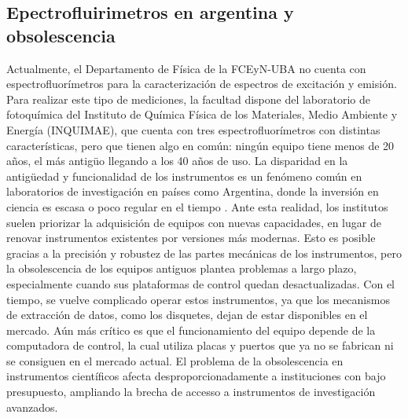 \subsection{Epectrofluirimetros en argentina y obsolescencia}

Actualmente, el Departamento de Física de la FCEyN-UBA no cuenta con espectrofluorímetros para la caracterización de espectros de excitación y emisión.  
Para realizar este tipo de mediciones, la facultad dispone del laboratorio de fotoquímica del Instituto de Química Física de los Materiales, Medio Ambiente y Energía (INQUIMAE), que cuenta con tres espectrofluorímetros con distintas características, pero que tienen algo en común: ningún equipo tiene menos de 20 años, el más antigüo llegando a los 40 años de uso.
La disparidad en la antigüedad y funcionalidad de los instrumentos es un fenómeno común en laboratorios de investigación en países como Argentina, donde la inversión en ciencia es escasa o poco regular en el tiempo \cite{cioccaRealityScientificResearch2017}. 
Ante esta realidad, los institutos suelen priorizar la adquisición de equipos con nuevas capacidades, en lugar de renovar instrumentos existentes por versiones más modernas.  
Esto es posible gracias a la precisión y robustez de las partes mecánicas de los instrumentos, pero la obsolescencia de los equipos antiguos plantea problemas a largo plazo, especialmente cuando sus plataformas de control quedan desactualizadas.  
Con el tiempo, se vuelve complicado operar estos instrumentos, ya que los mecanismos de extracción de datos, como los disquetes, dejan de estar disponibles en el mercado. 
Aún más crítico es que el funcionamiento del equipo depende de la computadora de control, la cual utiliza placas y puertos que ya no se fabrican ni se consiguen en el mercado actual.  
El problema de la obsolescencia en instrumentos científicos afecta desproporcionadamente a instituciones con bajo presupuesto, ampliando la brecha de accesso a instrumentos de investigación avanzados.

